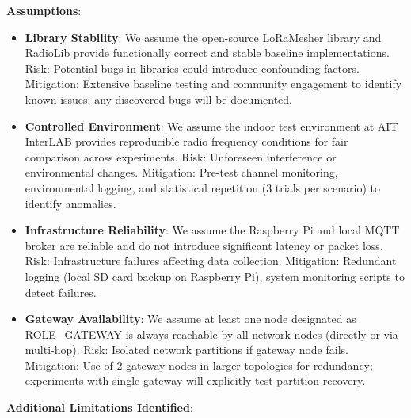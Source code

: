 \textbf{Assumptions}:

\begin{itemize}
\item \textbf{Library Stability}: We assume the open-source LoRaMesher library and RadioLib provide functionally correct and stable baseline implementations. Risk: Potential bugs in libraries could introduce confounding factors. Mitigation: Extensive baseline testing and community engagement to identify known issues; any discovered bugs will be documented.

\item \textbf{Controlled Environment}: We assume the indoor test environment at AIT InterLAB provides reproducible radio frequency conditions for fair comparison across experiments. Risk: Unforeseen interference or environmental changes. Mitigation: Pre-test channel monitoring, environmental logging, and statistical repetition (3 trials per scenario) to identify anomalies.

\item \textbf{Infrastructure Reliability}: We assume the Raspberry Pi and local MQTT broker are reliable and do not introduce significant latency or packet loss. Risk: Infrastructure failures affecting data collection. Mitigation: Redundant logging (local SD card backup on Raspberry Pi), system monitoring scripts to detect failures.

\item \textbf{Gateway Availability}: We assume at least one node designated as ROLE\_GATEWAY is always reachable by all network nodes (directly or via multi-hop). Risk: Isolated network partitions if gateway node fails. Mitigation: Use of 2 gateway nodes in larger topologies for redundancy; experiments with single gateway will explicitly test partition recovery.
\end{itemize}

\textbf{Additional Limitations Identified}:

